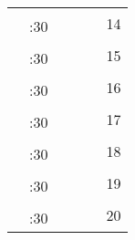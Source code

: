 \documentclass[10pt, a5paper, final, oneside]{memoir}
\newcommand{\grayline}{\arrayrulecolor{lightgray}\cline{1-5}\arrayrulecolor{black}}
\begin{document}
\begin{tabularx}{\linewidth}{|c|c|X|X|X|c}
    & & & && \multirow{2}{*}{14}\\ 
    \grayline
    & :30 & & &&\\ \hline
    
    & & & && \multirow{2}{*}{15}\\ 
    \grayline
    & :30 & & &&\\ \hline

    & & & && \multirow{2}{*}{16}\\ 
    \grayline
    & :30 & & &&\\ \hline

    & & & && \multirow{2}{*}{17}\\ 
    \grayline
    & :30 & & &&\\ \hline

    & & & && \multirow{2}{*}{18}\\ 
    \grayline
    & :30 & & &&\\ \hline

    & & & && \multirow{2}{*}{19}\\ 
    \grayline
    & :30 & & &&\\ \hline
    
    & & & && \multirow{2}{*}{20}\\ 
    \grayline
    & :30 & & &&\\ \hline

\end{tabularx}

\backmatter
\end{document}
